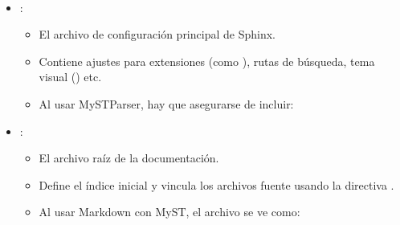 \documentclass[a4paper,10pt,spanish]{sphinxmanual}
\begin{document}
\paragraph{}
\label{\detokenize{configuracion_inicial/004.estructura_inicial_proyecto:archivos-importantes-en-source}}\begin{itemize}
\item {} 
\sphinxAtStartPar
{}:
\begin{itemize}
\item {} 
\sphinxAtStartPar
El archivo de configuración principal de Sphinx.

\item {} 
\sphinxAtStartPar
Contiene ajustes para extensiones (como ), rutas de búsqueda, tema visual () etc.

\item {} 
\sphinxAtStartPar
Al usar MyST\sphinxhyphen{}Parser, hay que asegurarse de incluir:

\begin{sphinxVerbatim}[commandchars=\\\{\}]
  \PYG{p}{[}\PYG{p}{]}
  
     
\end{sphinxVerbatim}

\end{itemize}

\item {} 
\sphinxAtStartPar
{}:
\begin{itemize}
\item {} 
\sphinxAtStartPar
El archivo raíz de la documentación.

\item {} 
\sphinxAtStartPar
Define el índice inicial y vincula los archivos fuente usando la directiva .

\item {} 
\sphinxAtStartPar
Al usar Markdown con MyST, el archivo se ve como:


\end{itemize}
\end{itemize}
\end{document}
